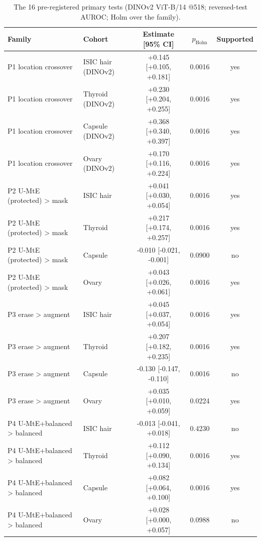 \begin{table}[H]\centering\small
\caption{The 16 pre-registered primary tests (DINOv2 ViT-B/14 @518; reversed-test AUROC; Holm over the family).}\label{tab:primary}
\begin{tabular}{llccc}\toprule
Family & Cohort & Estimate [95\% CI] & $p_{\text{Holm}}$ & Supported \\\midrule
P1 location crossover & ISIC hair (DINOv2) & +0.145 [+0.105, +0.181] & 0.0016 & yes \\
P1 location crossover & Thyroid (DINOv2) & +0.230 [+0.204, +0.255] & 0.0016 & yes \\
P1 location crossover & Capsule (DINOv2) & +0.368 [+0.340, +0.397] & 0.0016 & yes \\
P1 location crossover & Ovary (DINOv2) & +0.170 [+0.116, +0.224] & 0.0016 & yes \\
P2 U-MtE (protected) > mask & ISIC hair & +0.041 [+0.030, +0.054] & 0.0016 & yes \\
P2 U-MtE (protected) > mask & Thyroid & +0.217 [+0.174, +0.257] & 0.0016 & yes \\
P2 U-MtE (protected) > mask & Capsule & -0.010 [-0.021, -0.001] & 0.0900 & no \\
P2 U-MtE (protected) > mask & Ovary & +0.043 [+0.026, +0.061] & 0.0016 & yes \\
P3 erase > augment & ISIC hair & +0.045 [+0.037, +0.054] & 0.0016 & yes \\
P3 erase > augment & Thyroid & +0.207 [+0.182, +0.235] & 0.0016 & yes \\
P3 erase > augment & Capsule & -0.130 [-0.147, -0.110] & 0.0016 & no \\
P3 erase > augment & Ovary & +0.035 [+0.010, +0.059] & 0.0224 & yes \\
P4 U-MtE+balanced > balanced & ISIC hair & -0.013 [-0.041, +0.018] & 0.4230 & no \\
P4 U-MtE+balanced > balanced & Thyroid & +0.112 [+0.090, +0.134] & 0.0016 & yes \\
P4 U-MtE+balanced > balanced & Capsule & +0.082 [+0.064, +0.100] & 0.0016 & yes \\
P4 U-MtE+balanced > balanced & Ovary & +0.028 [+0.000, +0.057] & 0.0988 & no \\
\bottomrule\end{tabular}\end{table}
